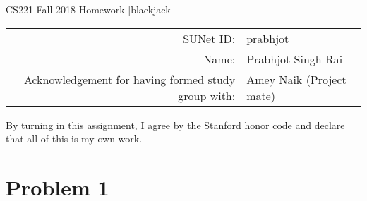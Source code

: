 \documentclass[12pt]{article}
\begin{document}
\begin{center}
{\Large CS221 Fall 2018 Homework [blackjack]}

\begin{tabular}{rl}
SUNet ID: & prabhjot \\
Name: & Prabhjot Singh Rai \\
Acknowledgement for having formed study group with: & Amey Naik (Project mate)
\end{tabular}
\end{center}

By turning in this assignment, I agree by the Stanford honor code and declare
that all of this is my own work.

\section*{Problem 1}
\end{document}
